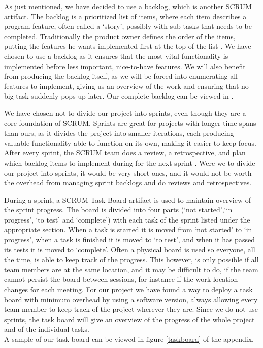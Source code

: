As just mentioned, we have decided to use a backlog, which is another SCRUM artifact.
The backlog is a prioritized list of items, where each item describes a program feature, often called a `story', possibly with sub-tasks that needs to be completed. Traditionally the product owner defines the order of the items, putting the features he wants implemented first at the top of the list \cite[p. 12]{scrum-org-guide}.
We have chosen to use a backlog as it ensures that the most vital functionality is implemented before less important, nice-to-have features. We will also benefit from producing the backlog itself, as we will be forced into enumerating all features to implement, giving us an overview of the work and ensuring that no big task suddenly pops up later.
Our complete backlog can be viewed in .

We have chosen not to divide our project into sprints, even though they are a core foundation of SCRUM.
Sprints are great for projects with longer time spans than ours, as it divides the project into smaller iterations, each producing valuable functionality able to function on its own, making it easier to keep focus.
After every sprint, the SCRUM team does a review, a retrospective, and plan which backlog items to implement during for the next sprint \cite[p. 8]{scrum-org-guide}.
Were we to divide our project into sprints, it would be very short ones, and it would not be worth the overhead from managing sprint backlogs and do reviews and retrospectives.

During a sprint, a SCRUM Task Board artifact is used to maintain overview of the sprint progress. The board is divided into four parts (`not started',`in progress', `to test' and `complete') with each task of the sprint listed under the appropriate section.
When a task is started it is moved from `not started' to `in progress', when a task is finished it is moved to `to test', and when it has passed its tests it is moved to `complete'.
Often a physical board is used so everyone, all the time, is able to keep track of the progress. This however, is only possible if all team members are at the same location, and it may be difficult to do, if the team cannot persist the board between sessions, for instance if the work location changes for each meeting.
For our project we have found a way to deploy a task board with minimum overhead by using a software version, always allowing every team member to keep track of the project wherever they are. Since we do not use sprints, the task board will give an overview of the progress of the whole project and of the individual tasks.\\
A sample of our task board can be viewed in figure \ref{taskboard} of the appendix.

